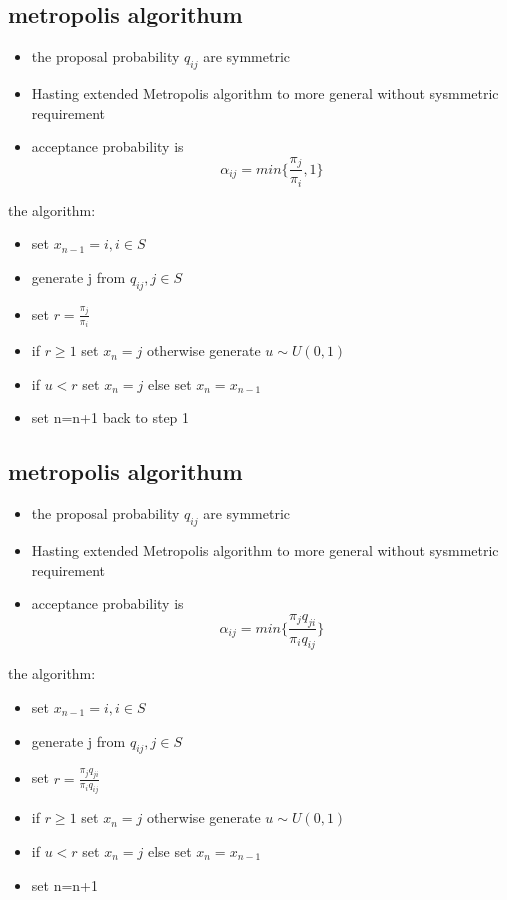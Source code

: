 \documentclass[10pt]{article}
\theoremstyle{break}
\begin{document}
\subsection{metropolis algorithum}
    \begin{itemize}
        \item the proposal probability $q_{ij}$ are symmetric 
        \item Hasting extended Metropolis algorithm to more general without sysmmetric requirement 
        \item acceptance probability is $$\alpha_{ij}=min\{\frac{\pi_j}{\pi_i}, 1\}$$
    \end{itemize}

    the algorithm:
    \begin{itemize}
        \item set $x_{n-1}=i, i\in S$
        \item generate j from $q_{ij}, j\in S$
        \item set $r=\frac{\pi_j}{\pi_i}$
        \item if $r \geq 1$ set $x_n=j$ otherwise generate $u\sim U(0,1)$
        \item if $u<r$ set $x_n=j$ else set $x_n=x_{n-1}$
        \item set n=n+1 back to step 1
    \end{itemize}



\subsection{metropolis algorithum}
    \begin{itemize}
        \item the proposal probability $q_{ij}$ are symmetric 
        \item Hasting extended Metropolis algorithm to more general without sysmmetric requirement 
        \item acceptance probability is $$\alpha_{ij}=min\{\frac{\pi_jq_{ji}}{\pi_iq_{ij}}\}$$
    \end{itemize}

    the algorithm:
    \begin{itemize}
        \item set $x_{n-1}=i, i\in S$
        \item generate j from $q_{ij}, j\in S$
        \item set $r=\frac{\pi_jq_{ji}}{\pi_iq_{ij}}$
        \item if $r \geq 1$ set $x_n=j$ otherwise generate $u\sim U(0,1)$
        \item if $u<r$ set $x_n=j$ else set $x_n=x_{n-1}$
        \item set n=n+1
    \end{itemize}
\end{document}

